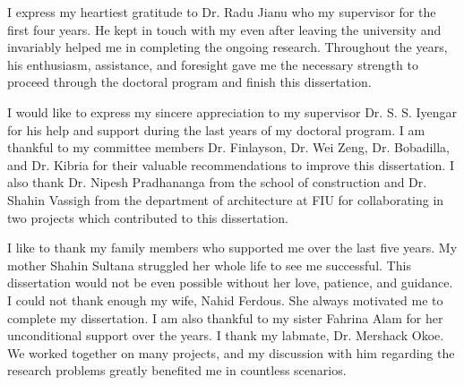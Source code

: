 \begin{acknowledgments}
I express my heartiest gratitude to Dr. Radu Jianu who my supervisor for the first four years. He kept in touch with my even after leaving the university and invariably helped me in completing the ongoing research. Throughout the years, his enthusiasm, assistance, and foresight gave me the necessary strength to proceed through the doctoral program and finish this dissertation. 

I would like to express my sincere appreciation to my supervisor Dr.  S. S. Iyengar for his help and support during the last years of my doctoral program. I am thankful to my committee members Dr. Finlayson, Dr. Wei Zeng, Dr. Bobadilla, and Dr. Kibria for their valuable recommendations to improve this dissertation. I also thank Dr. Nipesh Pradhananga from the school of construction and Dr. Shahin Vassigh from the department of architecture at FIU for collaborating in two projects which contributed to this dissertation.

I like to thank my family members who supported me over the last five years. My mother Shahin Sultana struggled her whole life to see me successful. This dissertation would not be even possible without her love, patience, and guidance.  I could not thank enough my wife, Nahid Ferdous. She always motivated me to complete my dissertation. I am also thankful to my sister Fahrina Alam for her unconditional support over the years.  I thank my labmate, Dr. Mershack Okoe. We worked together on many projects, and my discussion with him regarding the research problems greatly benefited me in countless scenarios. 
\end{acknowledgments}